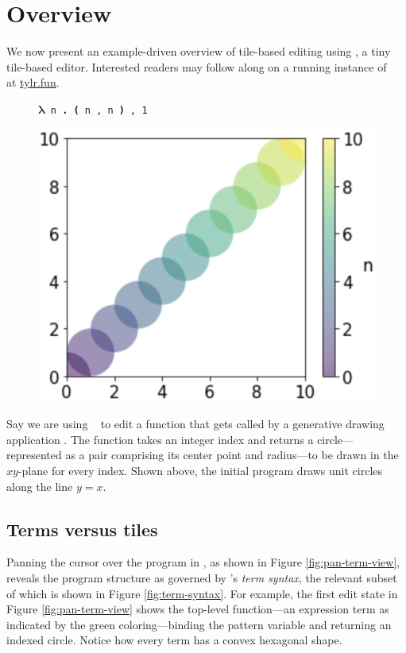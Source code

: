 \section{Overview}\label{sec:overview}

% 
% 


We now present an example-driven overview of tile-based
editing using \tylr, a tiny tile-based editor.
Interested readers may follow along on a running instance
of \tylr~ at \url{tylr.fun}.

\setlength\intextsep{0pt}
\begin{figure}
  \centering
  \texttt{$\boldsymbol{\lambda}$ n \textbf{.} \textbf{(} n , n \textbf{)} , 1}
  \vspace{0.2cm}

  \includegraphics[width=0.43\columnwidth]{img/circles-n-n-1.png}
\end{figure}

Say we are using \tylr~ to edit a function that gets called by a
generative drawing application \cite{Processing,sns-pldi}.
The function takes an integer index and
returns a circle---represented as a pair comprising
its center point and radius---to be drawn in
the $xy$-plane for every index.
Shown above, the initial program draws unit circles
along the line $y = x$.

\subsection{Terms versus tiles}



% 

Panning the cursor over the program in \tylr,
as shown in Figure \ref{fig:pan-term-view},
reveals the program structure as
governed by \tylr's \emph{term syntax},
the relevant subset of which is shown in
Figure \ref{fig:term-syntax}.
For example, the first edit state in Figure \ref{fig:pan-term-view}
shows the top-level function---an expression term as
indicated by the green coloring---binding
the pattern variable  and returning an indexed circle.
Notice how every term has a convex hexagonal shape.

